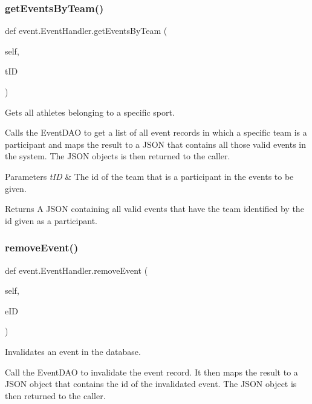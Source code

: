 \subsubsection{\texorpdfstring{get\+Events\+By\+Team()}{getEventsByTeam()}}
{\footnotesize\ttfamily def event.\+Event\+Handler.\+get\+Events\+By\+Team (\begin{DoxyParamCaption}\item[{}]{self,  }\item[{}]{t\+ID }\end{DoxyParamCaption})}



Gets all athletes belonging to a specific sport. 

Calls the Event\+D\+AO to get a list of all event records in which a specific team is a participant and maps the result to a J\+S\+ON that contains all those valid events in the system. The J\+S\+ON objects is then returned to the caller.


\begin{DoxyParams}{Parameters}
{\em t\+ID} & The id of the team that is a participant in the events to be given.\\
\hline
\end{DoxyParams}
\begin{DoxyReturn}{Returns}
A J\+S\+ON containing all valid events that have the team identified by the id given as a participant. 
\end{DoxyReturn}
\mbox{\label{classevent_1_1_event_handler_ac5f0b0f70fec862ce67c7654cef30b27}} 
\subsubsection{\texorpdfstring{remove\+Event()}{removeEvent()}}
{\footnotesize\ttfamily def event.\+Event\+Handler.\+remove\+Event (\begin{DoxyParamCaption}\item[{}]{self,  }\item[{}]{e\+ID }\end{DoxyParamCaption})}



Invalidates an event in the database. 

Call the Event\+D\+AO to invalidate the event record. It then maps the result to a J\+S\+ON object that contains the id of the invalidated event. The J\+S\+ON object is then returned to the caller.


